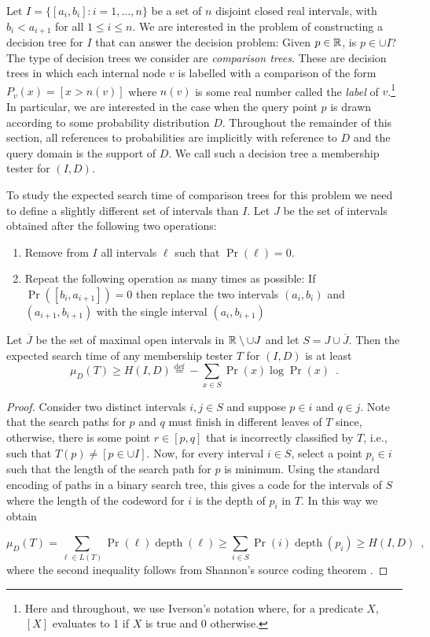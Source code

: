 \documentclass[charterfonts,lotsofwhite]{patmorin}
\newcommand{\defequals}{\stackrel{\mathrm{def}}{=}}
\DeclareMathOperator{\depth}{depth}
\begin{document}
Let $I=\{[a_i,b_i]: i=1,\ldots,n\}$ be a set of $n$ disjoint closed
real intervals, with $b_i < a_{i+1}$ for all $1\le i\le n$.  We are
interested in the problem of constructing a decision tree for $I$ that
can answer the decision problem: Given $p\in\mathbb{R}$, is $p\in \cup I$?
The type of decision trees we consider are \emph{comparison trees}.
These are decision trees in which each internal node $v$ is labelled
with a comparison of the form $P_v(x) = [x > n(v)]$ where $n(v)$ is
some real number called the \emph{label} of $v$.\footnote{Here and
throughout, we use Iverson's notation \cite{kXX} where, for a
predicate $X$, $[X]$ evaluates to 1 if $X$ is true and 0 otherwise.}
In particular, we are interested in the case when the query point $p$
is drawn according to some probability distribution $D$.   Throughout
the remainder of this section, all references to probabilities are
implicitly with reference to $D$ and the query domain is the support
of $D$.  We call such a decision tree a membership tester for $(I,D)$.

To study the expected search time of comparison trees for this problem
we need to define a slightly different set of intervals than $I$.  Let
$J$ be the set of intervals obtained after the following two
operations:

\begin{enumerate}

\item Remove from $I$ all intervals $\ell$ such that $\Pr(\ell) = 0$.

\item Repeat the following operation as many times as possible:  If
$\Pr([b_i,a_{i+1}])=0$ then replace the two intervals $(a_i,b_i)$ and
$(a_{i+1},b_{i+1})$ with the single interval $(a_i,b_{i+1})$
\end{enumerate}

\begin{lem}
Let $\overline{J}$ be the set of maximal open intervals in
$\mathbb{R}\setminus\cup J$ and let $S=J\cup \overline{J}$.  Then the
expected search time of any membership tester $T$ for $(I,D)$ is at least
\[
    \mu_D(T) \ge H(I,D) \defequals 
	-\sum_{x\in S} \Pr(x)\log \Pr(x) \enspace .
\]
\end{lem}

\begin{proof}
Consider two distinct intervals $i,j\in S$ and suppose $p\in i$ and
$q\in j$.  Note that the search paths for $p$ and $q$ must finish in
different leaves of $T$ since, otherwise, there is some point
$r\in[p,q]$ that is incorrectly classified by $T$, i.e., such
that $T(p)\neq [p\in\cup I]$.  Now, for every interval $i\in S$,
select a point $p_i\in i$ such that the length of the search path for
$p$ is minimum.   Using the standard encoding of paths in a binary
search tree, this gives a code for the intervals of $S$ where the
length of the codeword for $i$ is the depth of $p_i$ in $T$.  In this
way we obtain

\[
   \mu_D(T)
    = \sum_{\ell\in L(T)} \Pr(\ell)\depth(\ell)
   \ge \sum_{i \in S} \Pr(i)\depth(p_i)
   \ge H(I,D)
   \enspace , 
\]
where the second inequality follows from Shannon's source coding
theorem \cite{X}.
\end{proof}
\end{document}
